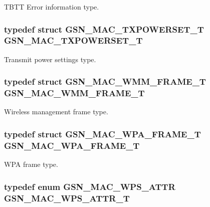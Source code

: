 TBTT Error information type. 

\hypertarget{a00642_ga4e1e0373dd92610638567c678eeee81d}{
\subsubsection[{GSN\_\-MAC\_\-TXPOWERSET\_\-T}]{\setlength{\rightskip}{0pt plus 5cm}typedef struct {\bf GSN\_\-MAC\_\-TXPOWERSET\_\-T}  {\bf GSN\_\-MAC\_\-TXPOWERSET\_\-T}}}
\label{a00642_ga4e1e0373dd92610638567c678eeee81d}


Transmit power settings type. 

\hypertarget{a00642_gab14ec7de1faea7e197f97d61281085fc}{
\subsubsection[{GSN\_\-MAC\_\-WMM\_\-FRAME\_\-T}]{\setlength{\rightskip}{0pt plus 5cm}typedef struct {\bf GSN\_\-MAC\_\-WMM\_\-FRAME\_\-T}  {\bf GSN\_\-MAC\_\-WMM\_\-FRAME\_\-T}}}
\label{a00642_gab14ec7de1faea7e197f97d61281085fc}


Wireless management frame type. 

\hypertarget{a00642_gadc2ef85538f39a0b8e01d199ccad1630}{
\subsubsection[{GSN\_\-MAC\_\-WPA\_\-FRAME\_\-T}]{\setlength{\rightskip}{0pt plus 5cm}typedef struct {\bf GSN\_\-MAC\_\-WPA\_\-FRAME\_\-T}  {\bf GSN\_\-MAC\_\-WPA\_\-FRAME\_\-T}}}
\label{a00642_gadc2ef85538f39a0b8e01d199ccad1630}


WPA frame type. 

\hypertarget{a00642_gaabc433282fb88ae2bc9ea6b726e4f049}{
\subsubsection[{GSN\_\-MAC\_\-WPS\_\-ATTR\_\-T}]{\setlength{\rightskip}{0pt plus 5cm}typedef enum {\bf GSN\_\-MAC\_\-WPS\_\-ATTR}  {\bf GSN\_\-MAC\_\-WPS\_\-ATTR\_\-T}}}
\label{a00642_gaabc433282fb88ae2bc9ea6b726e4f049}


